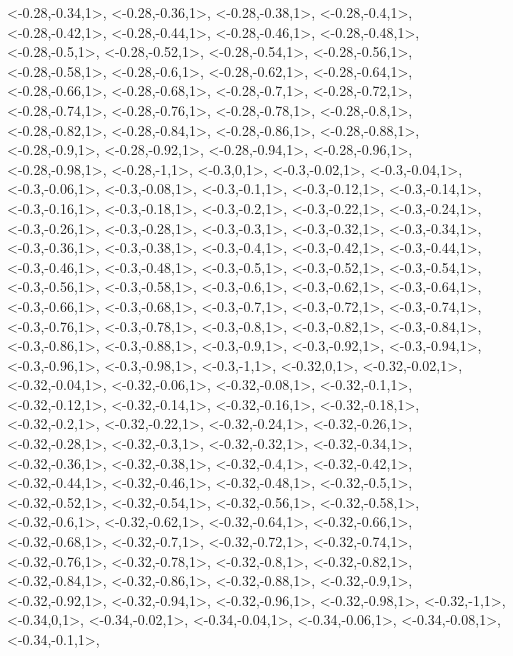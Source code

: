 \documentclass[a4paper,10pt]{article}
\begin{document}
\begin{eulernotebook}
\begin{euleroutput}
  <-0.28,-0.34,1>,
  <-0.28,-0.36,1>,
  <-0.28,-0.38,1>,
  <-0.28,-0.4,1>,
  <-0.28,-0.42,1>,
  <-0.28,-0.44,1>,
  <-0.28,-0.46,1>,
  <-0.28,-0.48,1>,
  <-0.28,-0.5,1>,
  <-0.28,-0.52,1>,
  <-0.28,-0.54,1>,
  <-0.28,-0.56,1>,
  <-0.28,-0.58,1>,
  <-0.28,-0.6,1>,
  <-0.28,-0.62,1>,
  <-0.28,-0.64,1>,
  <-0.28,-0.66,1>,
  <-0.28,-0.68,1>,
  <-0.28,-0.7,1>,
  <-0.28,-0.72,1>,
  <-0.28,-0.74,1>,
  <-0.28,-0.76,1>,
  <-0.28,-0.78,1>,
  <-0.28,-0.8,1>,
  <-0.28,-0.82,1>,
  <-0.28,-0.84,1>,
  <-0.28,-0.86,1>,
  <-0.28,-0.88,1>,
  <-0.28,-0.9,1>,
  <-0.28,-0.92,1>,
  <-0.28,-0.94,1>,
  <-0.28,-0.96,1>,
  <-0.28,-0.98,1>,
  <-0.28,-1,1>,
  <-0.3,0,1>,
  <-0.3,-0.02,1>,
  <-0.3,-0.04,1>,
  <-0.3,-0.06,1>,
  <-0.3,-0.08,1>,
  <-0.3,-0.1,1>,
  <-0.3,-0.12,1>,
  <-0.3,-0.14,1>,
  <-0.3,-0.16,1>,
  <-0.3,-0.18,1>,
  <-0.3,-0.2,1>,
  <-0.3,-0.22,1>,
  <-0.3,-0.24,1>,
  <-0.3,-0.26,1>,
  <-0.3,-0.28,1>,
  <-0.3,-0.3,1>,
  <-0.3,-0.32,1>,
  <-0.3,-0.34,1>,
  <-0.3,-0.36,1>,
  <-0.3,-0.38,1>,
  <-0.3,-0.4,1>,
  <-0.3,-0.42,1>,
  <-0.3,-0.44,1>,
  <-0.3,-0.46,1>,
  <-0.3,-0.48,1>,
  <-0.3,-0.5,1>,
  <-0.3,-0.52,1>,
  <-0.3,-0.54,1>,
  <-0.3,-0.56,1>,
  <-0.3,-0.58,1>,
  <-0.3,-0.6,1>,
  <-0.3,-0.62,1>,
  <-0.3,-0.64,1>,
  <-0.3,-0.66,1>,
  <-0.3,-0.68,1>,
  <-0.3,-0.7,1>,
  <-0.3,-0.72,1>,
  <-0.3,-0.74,1>,
  <-0.3,-0.76,1>,
  <-0.3,-0.78,1>,
  <-0.3,-0.8,1>,
  <-0.3,-0.82,1>,
  <-0.3,-0.84,1>,
  <-0.3,-0.86,1>,
  <-0.3,-0.88,1>,
  <-0.3,-0.9,1>,
  <-0.3,-0.92,1>,
  <-0.3,-0.94,1>,
  <-0.3,-0.96,1>,
  <-0.3,-0.98,1>,
  <-0.3,-1,1>,
  <-0.32,0,1>,
  <-0.32,-0.02,1>,
  <-0.32,-0.04,1>,
  <-0.32,-0.06,1>,
  <-0.32,-0.08,1>,
  <-0.32,-0.1,1>,
  <-0.32,-0.12,1>,
  <-0.32,-0.14,1>,
  <-0.32,-0.16,1>,
  <-0.32,-0.18,1>,
  <-0.32,-0.2,1>,
  <-0.32,-0.22,1>,
  <-0.32,-0.24,1>,
  <-0.32,-0.26,1>,
  <-0.32,-0.28,1>,
  <-0.32,-0.3,1>,
  <-0.32,-0.32,1>,
  <-0.32,-0.34,1>,
  <-0.32,-0.36,1>,
  <-0.32,-0.38,1>,
  <-0.32,-0.4,1>,
  <-0.32,-0.42,1>,
  <-0.32,-0.44,1>,
  <-0.32,-0.46,1>,
  <-0.32,-0.48,1>,
  <-0.32,-0.5,1>,
  <-0.32,-0.52,1>,
  <-0.32,-0.54,1>,
  <-0.32,-0.56,1>,
  <-0.32,-0.58,1>,
  <-0.32,-0.6,1>,
  <-0.32,-0.62,1>,
  <-0.32,-0.64,1>,
  <-0.32,-0.66,1>,
  <-0.32,-0.68,1>,
  <-0.32,-0.7,1>,
  <-0.32,-0.72,1>,
  <-0.32,-0.74,1>,
  <-0.32,-0.76,1>,
  <-0.32,-0.78,1>,
  <-0.32,-0.8,1>,
  <-0.32,-0.82,1>,
  <-0.32,-0.84,1>,
  <-0.32,-0.86,1>,
  <-0.32,-0.88,1>,
  <-0.32,-0.9,1>,
  <-0.32,-0.92,1>,
  <-0.32,-0.94,1>,
  <-0.32,-0.96,1>,
  <-0.32,-0.98,1>,
  <-0.32,-1,1>,
  <-0.34,0,1>,
  <-0.34,-0.02,1>,
  <-0.34,-0.04,1>,
  <-0.34,-0.06,1>,
  <-0.34,-0.08,1>,
  <-0.34,-0.1,1>,

\end{euleroutput}
\end{eulernotebook}
\end{document}
